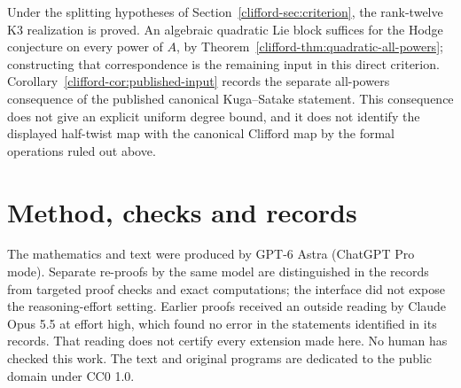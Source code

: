 \documentclass[11pt]{article}
\theoremstyle{definition}
\theoremstyle{remark}
\begin{document}
Under the splitting hypotheses of Section~\ref{clifford-sec:criterion},
the rank-twelve K3 realization is proved.  An algebraic quadratic Lie
block suffices for the Hodge conjecture on every power of $A$, by
Theorem~\ref{clifford-thm:quadratic-all-powers}; constructing that
correspondence is the remaining input in this direct criterion.
Corollary~\ref{clifford-cor:published-input} records the separate
all-powers consequence of the published canonical Kuga--Satake statement.
This consequence does not give an explicit uniform degree bound, and
it does not identify the displayed half-twist map with the canonical
Clifford map by the formal operations ruled out above.

\section*{Method, checks and records}
The mathematics and text were produced by GPT-6 Astra (ChatGPT Pro
mode). Separate re-proofs by the same model are distinguished in the
records from targeted proof checks and exact computations; the interface
did not expose the reasoning-effort setting. Earlier proofs received
an outside reading by Claude Opus 5.5 at effort high, which found no
error in the statements identified in its records. That reading does
not certify every extension made here. No human has checked this work.
The text and original programs are dedicated to the public domain
under CC0 1.0.
\end{document}
